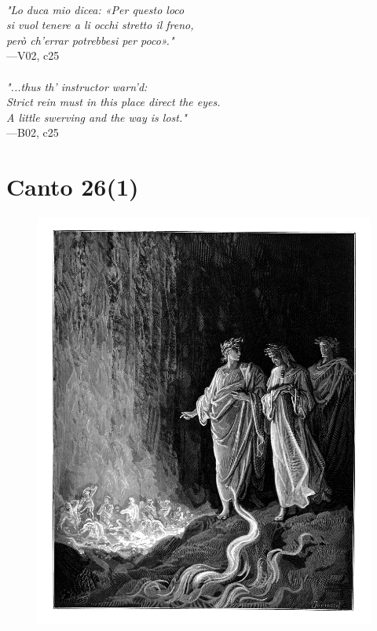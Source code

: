\documentclass[../Dore_vision.tex]{subfiles}
\begin{document}
\begin{center}
\begin{minipage}{0.8\linewidth}
\textit{\\
"Lo duca mio dicea: «Per questo loco\\si vuol tenere a li occhi stretto il freno,\\per\`o ch’errar potrebbesi per poco»."} \\
—V02, c25 \\~\\
\textit{"...thus th' instructor warn'd:\\ \textquotesingle Strict rein must in this place direct the eyes.\\A little swerving and the way is lost.\textquotesingle"} \\
—B02, c25
\end{minipage}
\end{center}

\newpage

\section{Canto 26(1)}

\begin{figure}[ht]
\centering
\includegraphics[height=\figsize]{illustrations/book_2/V02, c26(1).jpg}
\end{figure}
\end{document}
